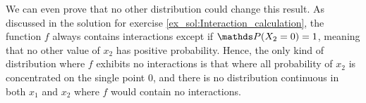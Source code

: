 {\begin{enumerate}[a)]
We can even prove that no other distribution could change this result.
As discussed in the solution for exercise \ref{ex_sol:Interaction_calculation}, the function $f$ always contains interactions except if \(\P(X_2 = 0) = 1\), meaning that no other value of $x_2$ has positive probability.
Hence, the only kind of distribution where $f$ exhibits no interactions is that where all probability of $x_2$ is concentrated on the single point $0$, and there is no distribution continuous in both $x_1$ and $x_2$ where $f$ would contain no interactions.

\end{enumerate}
}
